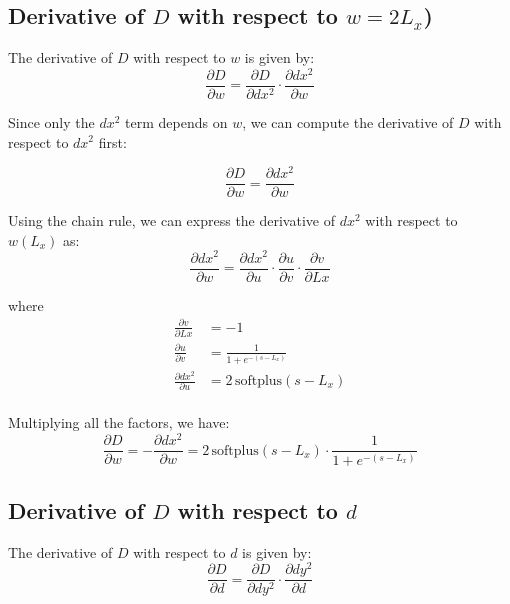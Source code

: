 \documentclass[11pt]{article}
\begin{document}
        \subsection*{Derivative of $D$ with respect to $w = 2L_x$)}
            The derivative of \(D\) with respect to \(w\) is given by:
            \begin{equation}
                \frac{\partial D}{\partial w} = \frac{\partial D}{\partial dx^2} \cdot \frac{\partial dx^2}{\partial w}
            \end{equation}

            Since only the \(dx^2\) term depends on \(w\), we can compute the derivative of \(D\) with respect to \(dx^2\) first:

            \begin{equation}
                \frac{\partial D}{\partial w} = \frac{\partial dx^2}{\partial w}
            \end{equation}

            Using the chain rule, we can express the derivative of \(dx^2\) with respect to \(w (L_x)\) as:
            \begin{equation}
                \frac{\partial dx^2}{\partial w} = \frac{\partial dx^2}{\partial u} \cdot \frac{\partial u}{\partial v} \cdot \frac{\partial v}{\partial Lx}
            \end{equation}

            where
            \begin{align}
                \frac{\partial v}{\partial Lx} &= -1\\
                \frac{\partial u}{\partial v} &= \frac{1}{1 + e^{-(s - L_x)}}\\
                \frac{\partial dx^2}{\partial u} &= 2\,\text{softplus}(s - L_x)\\
            \end{align}

            Multiplying all the factors, we have:
            \begin{equation}
                \frac{\partial D}{\partial w} = -\frac{\partial dx^2}{\partial w} = 2\,\text{softplus}(s - L_x) \cdot \frac{1}{1 + e^{-(s - L_x)}}
            \end{equation}


    \subsection*{Derivative of $D$ with respect to $d$}
        The derivative of \(D\) with respect to \(d\) is given by:
        \begin{equation}
            \frac{\partial D}{\partial d} = \frac{\partial D}{\partial dy^2} \cdot \frac{\partial dy^2}{\partial d}
        \end{equation}
\end{document}
